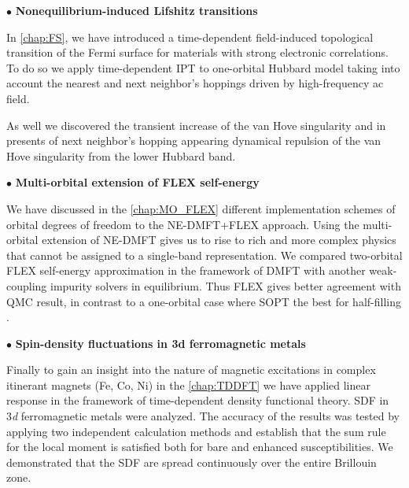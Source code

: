 \vspace*{0.2cm}
$\bullet$ \textbf{Nonequilibrium-induced Lifshitz transitions}

In \autoref{chap:FS}, we have introduced a time-dependent field-induced topological transition of the Fermi surface for materials with strong electronic correlations. To do so we apply time-dependent IPT to one-orbital Hubbard model taking into account the nearest and next neighbor's hoppings driven by high-frequency ac field.

As well we discovered the transient increase of the van Hove singularity and in presents of next neighbor's hopping appearing dynamical repulsion of the van Hove singularity from the lower Hubbard band.

\vspace*{0.2cm}
$\bullet$ \textbf{Multi-orbital extension of FLEX self-energy}

We have discussed in the \autoref{chap:MO_FLEX} different implementation schemes of orbital degrees of freedom to the NE-DMFT+FLEX approach. Using the multi-orbital extension of NE-DMFT gives us to rise to rich and more complex physics that cannot be assigned to a single-band representation. 
We compared two-orbital FLEX self-energy approximation in the framework of DMFT with another weak-coupling impurity solvers in equilibrium. Thus FLEX gives better agreement with QMC result, in contrast to a one-orbital case where SOPT the best for half-filling \citep{PhysRevB.91.235114}.

\vspace*{0.2cm}
$\bullet$ \textbf{Spin-density fluctuations in 3d ferromagnetic metals}

Finally to gain an insight into the nature of magnetic excitations in complex itinerant magnets (Fe, Co, Ni) in the \autoref{chap:TDDFT} we have applied linear response in the framework of time-dependent density functional theory. SDF in 3\emph{d} ferromagnetic metals were analyzed. The accuracy of the results was tested by applying two independent calculation methods and establish that the sum rule for the local moment is satisfied both for bare and enhanced susceptibilities. We demonstrated that the SDF are spread continuously over the entire Brillouin zone.



